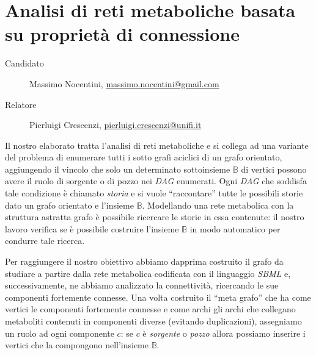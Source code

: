 \documentclass[twoside,openright,titlepage,fleqn,
headinclude,11pt,a4paper,BCOR5mm,footinclude ]{scrbook}
\begin{document}
\frenchspacing
\raggedbottom
{}
\pagestyle{plain}
%
\pagestyle{scrheadings}

\lstset{
	language = java
	, numbers = left 
	, basicstyle=\sffamily%
	, tabsize=2
	, captionpos=b
	, breaklines=true
	, showspaces=false
	, showstringspaces=false
}

\chapter*{Analisi di reti metaboliche basata su propriet\`a di
  connessione}
\begin{description}
\item[Candidato] Massimo Nocentini, \url{massimo.nocentini@gmail.com}
\item[Relatore] Pierluigi Crescenzi, \url{pierluigi.crescenzi@unifi.it}
\end{description}
Il nostro elaborato tratta l'analisi di reti metaboliche e si collega
ad una variante del problema di enumerare tutti i sotto grafi aciclici
di un grafo orientato, aggiungendo il vincolo che solo un determinato
sottoinsieme $\mathbb{B}$ di vertici possono avere il ruolo di
sorgente o di pozzo nei \emph{DAG} enumerati. Ogni \emph{DAG} che
soddisfa tale condizione \`e chiamato \emph{storia} e si vuole
``raccontare'' tutte le possibili storie dato un grafo orientato e
l'insieme $\mathbb{B}$. Modellando una rete metabolica con la
struttura astratta grafo \`e possibile ricercare le storie in essa
contenute: il nostro lavoro verifica se \`e possibile costruire
l'insieme $\mathbb{B}$ in modo automatico per condurre tale ricerca.

Per raggiungere il nostro obiettivo abbiamo dapprima costruito il
grafo da studiare a partire dalla rete metabolica codificata con il
linguaggio \emph{SBML} e, successivamente, ne abbiamo analizzato la
connettivit\`a, ricercando le sue componenti fortemente connesse. Una
volta costruito il ``meta grafo'' che ha come vertici le componenti
fortemente connesse e come archi gli archi che collegano metaboliti
contenuti in componenti diverse (evitando duplicazioni), assegniamo un
ruolo ad ogni componente $c$: se $c$ \`e \emph{sorgente} o
\emph{pozzo} allora possiamo inserire i vertici che la compongono
nell'insieme $\mathbb{B}$.
\end{document}
